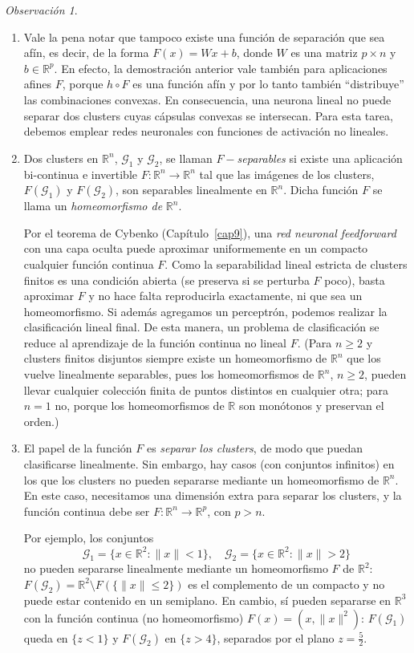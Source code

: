 \documentclass[12pt, a4paper]{amsbook}
\newcommand{\R}{{\mathbb R}}
\newcommand{\G}{{\mathcal G}}
\theoremstyle{remark}
\newtheorem{obs}[teo]{Observaci\'on}
\theoremstyle{definition}
\numberwithin{section}{chapter}
\numberwithin{subsection}{section}
\numberwithin{equation}{section}
\numberwithin{figure}{chapter}
\begin{document}
\begin{obs}
\begin{enumerate}
\item[(i)] Vale la pena notar que tampoco existe una función de separación que sea afín, es decir, de la forma $F(x) = Wx + b$, donde $W$ es una matriz $p \times n$ y $b \in \R^p$. En efecto, la demostración anterior vale también para aplicaciones afines $F$, porque $h\circ F$ es una función afín y por lo tanto también ``distribuye'' las combinaciones convexas. En consecuencia, una neurona lineal no puede separar dos clusters cuyas cápsulas convexas se intersecan. Para esta tarea, debemos emplear redes neuronales con funciones de activación no lineales.

\item[(ii)] Dos clusters en $\R^n$, $\G_1$ y $\G_2$, se llaman {\em $F-$separables} si existe una aplicación bi-continua e invertible $F\colon \R^n \to \R^n$ tal que las imágenes de los clusters, $F(\G_1)$ y $F(\G_2)$, son separables linealmente en $\R^n$. Dicha función $F$ se llama un {\em homeomorfismo de} $\R^n$.

Por el teorema de Cybenko (Capítulo~\ref{cap9}), una {\em red neuronal feedforward} con una capa oculta puede aproximar uniformemente en un compacto cualquier función continua $F$. Como la separabilidad lineal estricta de clusters finitos es una condición abierta (se preserva si se perturba $F$ poco), basta aproximar $F$ y no hace falta reproducirla exactamente, ni que sea un homeomorfismo. Si además agregamos un perceptrón, podemos realizar la clasificación lineal final. De esta manera, un problema de clasificación se reduce al aprendizaje de la función continua no lineal $F$. (Para $n\ge2$ y clusters finitos disjuntos siempre existe un homeomorfismo de $\R^n$ que los vuelve linealmente separables, pues los homeomorfismos de $\R^n$, $n\ge2$, pueden llevar cualquier colección finita de puntos distintos en cualquier otra; para $n=1$ no, porque los homeomorfismos de $\R$ son monótonos y preservan el orden.)

\item[(iii)] El papel de la función $F$ es {\em separar los clusters}, de modo que puedan clasificarse linealmente. Sin embargo, hay casos (con conjuntos infinitos) en los que los clusters no pueden separarse mediante un homeomorfismo de $\R^n$. En este caso, necesitamos una dimensión extra para separar los clusters, y la función continua debe ser $F\colon \R^n \to \R^p$, con $p > n$. 

Por ejemplo, los conjuntos
$$
\G_1 = \{ x \in \R^2\colon  \|x\| < 1 \}, \quad \G_2 = \{ x \in \R^2\colon \|x\| > 2 \}
$$
no pueden separarse linealmente mediante un homeomorfismo $F$ de $\R^2$: $F(\G_2)=\R^2\setminus F(\{\|x\|\le2\})$ es el complemento de un compacto y no puede estar contenido en un semiplano. En cambio, sí pueden separarse en $\R^3$ con la función continua (no homeomorfismo) $F(x)=(x,\|x\|^2)$: $F(\G_1)$ queda en $\{z<1\}$ y $F(\G_2)$ en $\{z>4\}$, separados por el plano $z=\frac52$.
\end{enumerate}
\end{obs}
\end{document}
